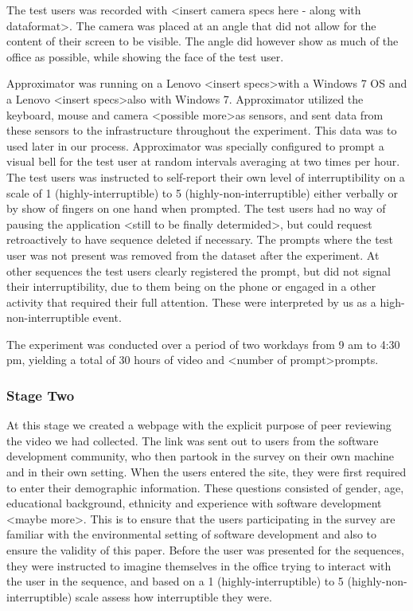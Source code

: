 \documentclass{sigchi}
\begin{document}
The test users was recorded with \textless insert camera specs here - along with dataformat\textgreater.
The camera was placed at an angle that did not allow for the content of their screen to be visible.
The angle did however show as much of the office as possible, while showing the face of the test user.

Approximator was running on a Lenovo \textless insert specs\textgreater with a Windows 7 OS and a Lenovo \textless insert specs\textgreater also with Windows 7.
Approximator utilized the keyboard, mouse and camera \textless possible more\textgreater as sensors, and sent data from these sensors to the infrastructure throughout the experiment.
This data was to used later in our process.
Approximator was specially configured to prompt a visual bell for the test user at random intervals averaging at two times per hour.
The test users was instructed to self-report their own level of interruptibility on a scale of 1 (highly-interruptible) to 5 (highly-non-interruptible) either verbally or by show of fingers on one hand when prompted.
The test users had no way of pausing the application \textless still to be finally determided\textgreater, but could request retroactively to have sequence deleted if necessary.
The prompts where the test user was not present was removed from the dataset after the experiment.
At other sequences the test users clearly registered the prompt, but did not signal their interruptibility, due to them being on the phone or engaged in a other activity that required their full attention. These were interpreted by us as a high-non-interruptible event.

The experiment was conducted over a period of two workdays from 9 am to 4:30 pm, yielding a total of 30 hours of video and \textless number of prompt\textgreater prompts.

\subsubsection{Stage Two}
At this stage we created a webpage with the explicit purpose of peer reviewing the video we had collected. The link was sent out to users from the software development community, who then partook in the survey on their own machine and in their own setting.
When the users entered the site, they were first required to enter their demographic information.
These questions consisted of gender, age, educational background, ethnicity and experience with software development \textless maybe more\textgreater.
This is to ensure that the users participating in the survey are familiar with the environmental setting of software development and also to ensure the validity of this paper.
Before the user was presented for the sequences, they were instructed to imagine themselves in the office trying to interact with the user in the sequence, and based on a 1 (highly-interruptible) to 5 (highly-non-interruptible) scale assess how interruptible they were.
\end{document}

